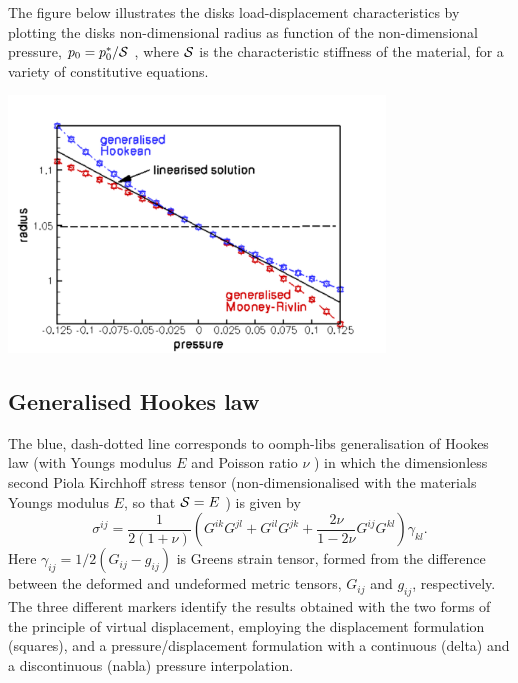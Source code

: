 The figure below illustrates the disk\textquotesingle{}s load-\/displacement characteristics by plotting the disk\textquotesingle{}s non-\/dimensional radius as function of the non-\/dimensional pressure, $ p_0 = p_0^*/{\cal S} $ , where $ {\cal S} $ is the characteristic stiffness of the material, for a variety of constitutive equations.

 
\begin{DoxyImage}
\includegraphics[width=0.75\textwidth]{trace}
\end{DoxyImage}
\hypertarget{index_hooke}{}\subsection{Generalised Hooke\textquotesingle{}s law}\label{index_hooke}
The blue, dash-\/dotted line corresponds to {\ttfamily oomph-\/lib\textquotesingle{}s} generalisation of Hooke\textquotesingle{}s law (with Young\textquotesingle{}s modulus $ E $ and Poisson ratio $ \nu $ ) in which the dimensionless second Piola Kirchhoff stress tensor (non-\/dimensionalised with the material\textquotesingle{}s Young\textquotesingle{}s modulus $ E $, so that $ {\cal S} = E $ ) is given by \[ \sigma^{ij} = \frac{1}{2(1+\nu)} \left( G^{ik} G^{jl} + G^{il} G^{jk} + \frac{2\nu}{1-2\nu} G^{ij} G^{kl} \right) \gamma_{kl}. \] Here $ \gamma_{ij}= 1/2 (G_{ij}-g_{ij})$ is Green\textquotesingle{}s strain tensor, formed from the difference between the deformed and undeformed metric tensors, $ G_{ij} $ and $ g_{ij} $, respectively. The three different markers identify the results obtained with the two forms of the principle of virtual displacement, employing the displacement formulation (squares), and a pressure/displacement formulation with a continuous (delta) and a discontinuous (nabla) pressure interpolation.

